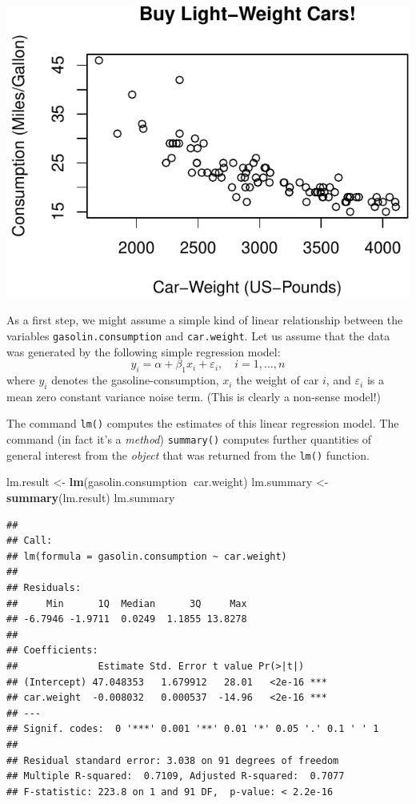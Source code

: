 \documentclass[]{book}
\newenvironment{Shaded}{\begin{snugshade}}{\end{snugshade}}
\newcommand{\KeywordTok}[1]{\textcolor[rgb]{0.13,0.29,0.53}{\textbf{#1}}}
\newcommand{\NormalTok}[1]{#1}
\newcommand{\OperatorTok}[1]{\textcolor[rgb]{0.81,0.36,0.00}{\textbf{#1}}}
\newcommand{\StringTok}[1]{\textcolor[rgb]{0.31,0.60,0.02}{#1}}
\theoremstyle{definition}
\theoremstyle{definition}
\theoremstyle{definition}
\theoremstyle{remark}
\begin{document}
\includegraphics{01-Introduction-to-R_files/figure-latex/fig-margin-1.pdf}

As a first step, we might assume a simple kind of linear relationship between the variables \texttt{gasolin.consumption} and \texttt{car.weight}. Let us assume that the data was generated by the following simple regression model:
\[
y_i=\alpha+\beta_1 x_i+\varepsilon_i,\quad i=1,\dots,n
\]
where \(y_i\) denotes the gasoline-consumption, \(x_i\) the weight of car \(i\), and \(\varepsilon_i\) is a mean zero constant variance noise term. (This is clearly a non-sense model!)

The command \texttt{lm()} computes the estimates of this linear regression model. The command (in fact it's a \emph{method}) \texttt{summary()} computes further quantities of general interest from the \emph{object} that was returned from the \texttt{lm()} function.

\begin{Shaded}
\begin{Highlighting}[]
\NormalTok{lm.result   <-}\StringTok{ }\KeywordTok{lm}\NormalTok{(gasolin.consumption}\OperatorTok{~}\NormalTok{car.weight)}
\NormalTok{lm.summary  <-}\StringTok{ }\KeywordTok{summary}\NormalTok{(lm.result)}
\NormalTok{lm.summary}
\end{Highlighting}
\end{Shaded}

\begin{verbatim}
## 
## Call:
## lm(formula = gasolin.consumption ~ car.weight)
## 
## Residuals:
##     Min      1Q  Median      3Q     Max 
## -6.7946 -1.9711  0.0249  1.1855 13.8278 
## 
## Coefficients:
##              Estimate Std. Error t value Pr(>|t|)    
## (Intercept) 47.048353   1.679912   28.01   <2e-16 ***
## car.weight  -0.008032   0.000537  -14.96   <2e-16 ***
## ---
## Signif. codes:  0 '***' 0.001 '**' 0.01 '*' 0.05 '.' 0.1 ' ' 1
## 
## Residual standard error: 3.038 on 91 degrees of freedom
## Multiple R-squared:  0.7109, Adjusted R-squared:  0.7077 
## F-statistic: 223.8 on 1 and 91 DF,  p-value: < 2.2e-16
\end{verbatim}
\end{document}
